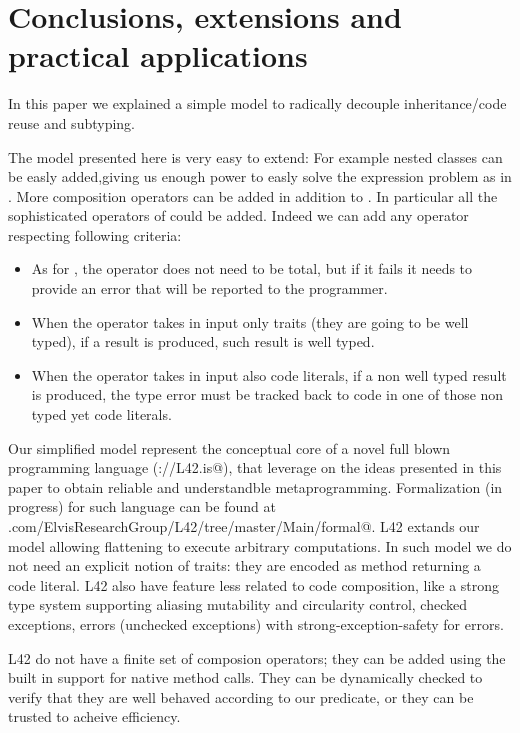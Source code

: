 \section{Conclusions, extensions and practical applications}

In this paper we explained a simple model to 
radically decouple inheritance/code reuse and subtyping.

The model presented here is very easy to extend:
For example nested classes can be easly added,giving us enough power to easly solve the expression problem as in \cite{deep}. More composition operators can be added in addition to \use.
In particular all the sophisticated operators of \cite{deep} could be added.
 Indeed we can add any operator respecting following criteria:

\begin{itemize}
\item As for \use, the operator does not need to be total, but if it fails it needs to provide an error that will be reported to the programmer.
\item When the operator takes in input only traits (they are going to be well typed), if a result is produced,
 such result is well typed.
\item When the operator takes in input also code literals, if a non well typed result is produced,
the type error must be tracked back to code in one of those non typed yet code literals.
 \end{itemize}
 

 
 Our simplified model represent the conceptual core of  a novel full blown programming language 
 (\verb@http://L42.is@),
that leverage on the ideas presented in this paper to obtain reliable and understandble metaprogramming.
Formalization (in progress) for such language can be found at 
\verb@github.com/ElvisResearchGroup/L42/tree/master/Main/formal@.
L42 extands our model allowing
flattening to execute arbitrary computations.
In such model we do not need an explicit notion of traits: they are encoded as method returning a code literal.
L42 also have feature less related to code composition, like
  a strong type system supporting aliasing mutability and circularity control,
   checked exceptions, errors (unchecked exceptions) with strong-exception-safety for errors.

L42 do not have a finite set of composion operators; they can be added using the built in support for native method calls. They can be dynamically checked to verify that they are well behaved according to our predicate, or they can be trusted to acheive efficiency. 


